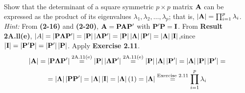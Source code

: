         Show that the determinant of a square symmetric $p \times p$ matrix $\bold{A}$ can be expressed as
        the product of its eigenvalues $\lambda_1 , \lambda_2, \dots , \lambda_p$; that is, $\left|\bold{A}\right| = \prod_{i=1}^p{\lambda_i}$.
        \newline
        \textit{Hint:} From \textbf{(2-16)} and \textbf{(2-20)}, $\bold{A} =\bold{P}\bold{A}\bold{P}^\prime$ with $\bold{P}^\prime\bold{P} =\bold{I}$. From \textbf{Result 2A.ll(e)},
        $\left|A\right| = \left|\bold{P}\bold{\Lambda}\bold{P}^\prime\right| = \left|\bold{P}\right| \left|\bold{\Lambda}\bold{P}^\prime\right| = \left|\bold{P}\right| \left|\bold{\Lambda}\right| \left|\bold{P}^\prime\right| = \left|\bold{\Lambda}\right| \left|\bold{I}\right|$,since $\left|\bold{I}\right| = \left|\bold{P}^\prime\bold{P}\right| = \left|\bold{P}^\prime\right| \left|\bold{P}\right|$. Apply
        \textbf{Exercise 2.11}.
        \[
            \left|\bold{A}\right|
            = 
            \left|\bold{P}\bold{\Lambda}\bold{P}^\prime\right|
            \overset{\text{2A.11(e)}}{=} 
            \left|\bold{P}\right|\left|\bold{\Lambda}\bold{P}^\prime\right| \overset{\text{2A.11(e)}}{=} 
            \left|\bold{P}\right|\left|\bold{\Lambda}\right|\left|\bold{P}^\prime\right| 
            = 
            \left|\bold{\Lambda}\right|\left|\bold{P}\right|\left|\bold{P}^\prime\right| 
            =
        \]
        \[
            =
            \left|\bold{\Lambda}\right|\left|\bold{P}\bold{P}^\prime\right|
            =
            \left|\bold{\Lambda}\right|\left|\bold{I}\right|
            =
            \left|\bold{\Lambda}\right|(1)
            =
            \left|\bold{\Lambda}\right|
            \overset{\text{Exercise 2.11}}{=}
            \prod_{i=1}^p{\lambda_i}
        \]